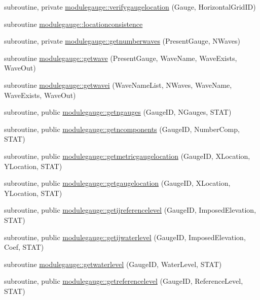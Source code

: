 \begin{DoxyCompactItemize}
subroutine, private \mbox{\hyperlink{namespacemodulegauge_a5143391f003e2c838204ca20768435a4}{modulegauge\+::verifygaugelocation}} (Gauge, Horizontal\+Grid\+ID)
\item 
subroutine \mbox{\hyperlink{namespacemodulegauge_a3c28cc048b2b01fde65fb7a5fc9f7213}{modulegauge\+::locationconsistence}}
\item 
subroutine, private \mbox{\hyperlink{namespacemodulegauge_a3e3b74ba912595c577820445ad14cb64}{modulegauge\+::getnumberwaves}} (Present\+Gauge, N\+Waves)
\item 
subroutine \mbox{\hyperlink{namespacemodulegauge_a0e2dffbc5ada081dc537e80f461ae0eb}{modulegauge\+::getwave}} (Present\+Gauge, Wave\+Name, Wave\+Exists, Wave\+Out)
\item 
subroutine \mbox{\hyperlink{namespacemodulegauge_af6c96743755f8c096eb5335e0993e175}{modulegauge\+::getwavei}} (Wave\+Name\+List, N\+Waves, Wave\+Name, Wave\+Exists, Wave\+Out)
\item 
subroutine, public \mbox{\hyperlink{namespacemodulegauge_a7a4e1ac4c0d2468bf869594a8677a7d0}{modulegauge\+::getngauges}} (Gauge\+ID, N\+Gauges, S\+T\+AT)
\item 
subroutine, public \mbox{\hyperlink{namespacemodulegauge_adc2b7e3c857dc1649430eaa5a0fb1882}{modulegauge\+::getncomponents}} (Gauge\+ID, Number\+Comp, S\+T\+AT)
\item 
subroutine, public \mbox{\hyperlink{namespacemodulegauge_af98cce9ae7ea92a6068724894d803842}{modulegauge\+::getmetricgaugelocation}} (Gauge\+ID, X\+Location, Y\+Location, S\+T\+AT)
\item 
subroutine, public \mbox{\hyperlink{namespacemodulegauge_a118b41963f151494a832cd94010c6282}{modulegauge\+::getgaugelocation}} (Gauge\+ID, X\+Location, Y\+Location, S\+T\+AT)
\item 
subroutine, public \mbox{\hyperlink{namespacemodulegauge_a9b801d4a79f8bfd52e8276c2b5525b5e}{modulegauge\+::getijreferencelevel}} (Gauge\+ID, Imposed\+Elevation, S\+T\+AT)
\item 
subroutine, public \mbox{\hyperlink{namespacemodulegauge_aa7b1b101cf558db427ad03b4a0e72f09}{modulegauge\+::getijwaterlevel}} (Gauge\+ID, Imposed\+Elevation, Coef, S\+T\+AT)
\item 
subroutine \mbox{\hyperlink{namespacemodulegauge_a0201de248a96f786a6ac1e9875435ba3}{modulegauge\+::getwaterlevel}} (Gauge\+ID, Water\+Level, S\+T\+AT)
\item 
subroutine, public \mbox{\hyperlink{namespacemodulegauge_a3f8df5ad4b3209ed0c1f3dda8945093f}{modulegauge\+::getreferencelevel}} (Gauge\+ID, Reference\+Level, S\+T\+AT)

\end{DoxyCompactItemize}
